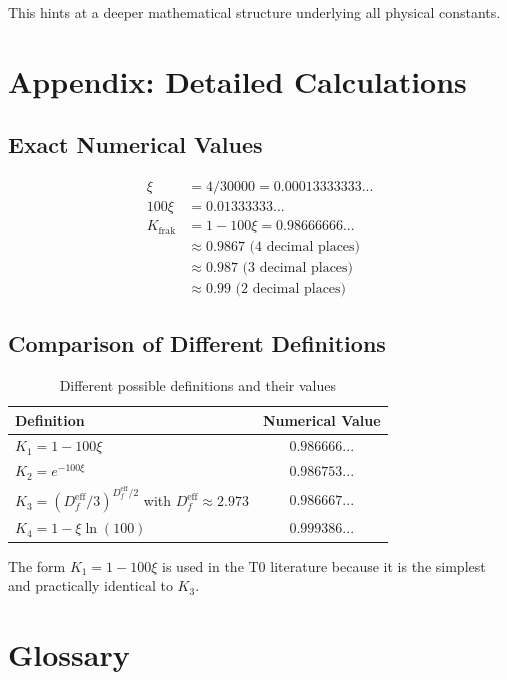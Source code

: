 	This hints at a deeper mathematical structure underlying all physical constants.
	
	\section{Appendix: Detailed Calculations}
	
	\subsection{Exact Numerical Values}
	
	\begin{align}
		\xi &= 4/30000 = 0.00013333333... \\
		100\xi &= 0.01333333... \\
		K_{\text{frak}} &= 1 - 100\xi = 0.98666666... \\
		&\approx 0.9867 \text{ (4 decimal places)} \\
		&\approx 0.987 \text{ (3 decimal places)} \\
		&\approx 0.99 \text{ (2 decimal places)}
	\end{align}
	
	\subsection{Comparison of Different Definitions}
	
	\begin{table}[h]
		\centering
		\begin{tabular}{lc}
			\toprule
			\textbf{Definition} & \textbf{Numerical Value} \\
			\midrule
			$K_1 = 1 - 100\xi$ & $0.986666...$ \\
			$K_2 = e^{-100\xi}$ & $0.986753...$ \\
			$K_3 = (D_f^{\text{eff}}/3)^{D_f^{\text{eff}}/2}$ with $D_f^{\text{eff}} \approx 2.973$ & $0.986667...$ \\
			$K_4 = 1 - \xi \ln(100)$ & $0.999386...$ \\
			\bottomrule
		\end{tabular}
		\caption{Different possible definitions and their values}
	\end{table}
	
	The form $K_1 = 1 - 100\xi$ is used in the T0 literature because it is the simplest and practically identical to $K_3$.
	
	\section{Glossary}
	
